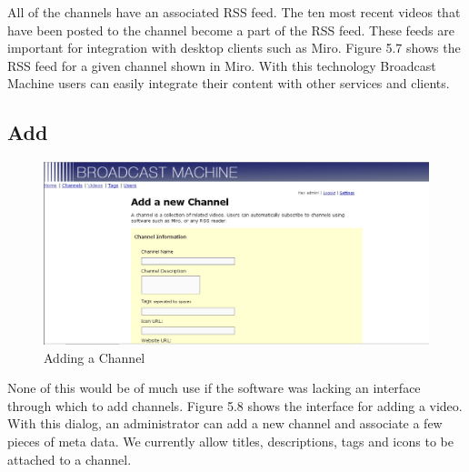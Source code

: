 \documentclass[a4paper,12pt]{report}
\begin{document}
All of the channels have an associated RSS feed.
The ten most recent videos that have been posted to the channel become a part of the RSS feed.
These feeds are important for integration with desktop clients such as Miro. Figure 5.7 shows the RSS feed for a given channel shown in Miro.
With this technology Broadcast Machine users can easily integrate their content with other services and clients.

\subsection{Add}
\begin{figure}[htp]
\begin{center}
\includegraphics[width=150mm]{./images/channeladd.png}
\end{center}
\caption{Adding a Channel}
\end{figure}

None of this would be of much use if the software was lacking an interface through which to add channels. Figure 5.8 shows the interface for adding a video. With this dialog, an administrator can add a new channel and associate a few pieces of meta data.
We currently allow titles, descriptions, tags and icons to be attached to a channel.
\end{document}
